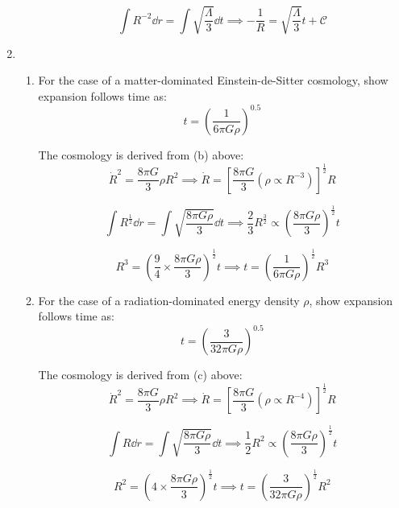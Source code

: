 \documentclass{paper}
\begin{document}
\begin{enumerate}
\begin{enumerate}
          \[
            \int R^{-2}\dd{r} = \int \sqrt{\frac{\Lambda}{3}}\dd{t}
          \implies -\frac{1}{R} = \sqrt{\frac{\Lambda}{3}} t + \mathcal{C}
          \]

      \end{enumerate}


    \item %
      \begin{enumerate}
        \item
          For the case of a matter-dominated Einstein-de-Sitter cosmology,
          show expansion follows time as:
          \[ t = \left(\frac{1}{6 \pi G \rho}\right)^{0.5} \]

          The cosmology is derived from (b) above:
          \[ 
          \dot{R}^2 = \frac{8 \pi G}{3}\rho R^2 \implies
          \dot{R} = 
          \left[\frac{8 \pi G}{3}(\rho \propto R^{-3})\right]^{\frac{1}{2}} R
          \] 

          \[
          \int R^{\frac{1}{2}}\dd{r} 
          = \int \sqrt{\frac{8 \pi G \rho}{3}}\dd{t}
          \implies 
          \frac{2}{3}R^{\frac{3}{2}} \propto
          \left(\frac{8 \pi G \rho }{3}\right)^\frac{1}{2} t 
          \]

          \[
            R^3=\left(\frac{9}{4}\times
            \frac{8 \pi G \rho}{3}\right)^\frac{1}{2} t 
          \implies
          t = \left(\frac{1}{6 \pi G \rho}\right)^\frac{1}{2} R^3
          \]

        \item
          For the case of a radiation-dominated energy density \(\rho\),
          show expansion follows time as:
          \[ t = \left(\frac{3}{32 \pi G \rho}\right)^{0.5} \]

          The cosmology is derived from (c) above:
          \[ 
          \dot{R}^2 = \frac{8 \pi G}{3}\rho R^2 \implies
          \dot{R} = 
          \left[\frac{8 \pi G}{3}(\rho \propto R^{-4})\right]^{\frac{1}{2}} R
          \] 

          \[
          \int R\dd{r} 
          = \int \sqrt{\frac{8 \pi G \rho}{3}}\dd{t}
          \implies 
          \frac{1}{2}R^2 \propto
          \left(\frac{8 \pi G \rho }{3}\right)^\frac{1}{2} t 
          \]

          \[
          R^2 =\left(4\times\frac{8 \pi G \rho}{3}\right)^\frac{1}{2} t 
          \implies
          t = \left(\frac{3}{32 \pi G \rho}\right)^\frac{1}{2} R^2
          \]

      \end{enumerate}


\end{enumerate}
\end{document}
